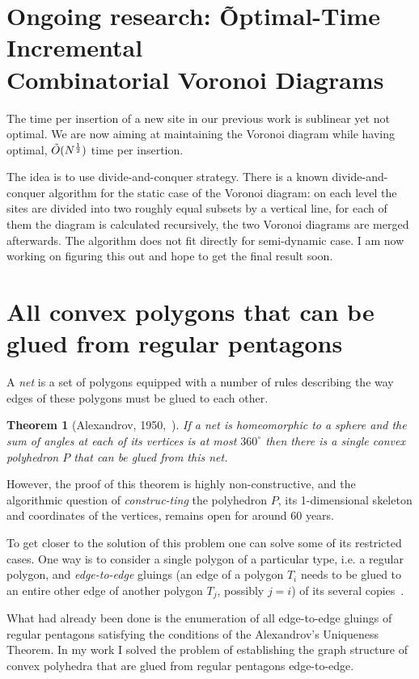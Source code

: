 \documentclass[a4paper,11pt]{article}
\def\vsection#1{\vspace{-4mm}\section{#1}\vspace{-3mm}}
\newtheorem{theorem}{Theorem}
\theoremstyle{definition}
\begin{document}
\vsection{Ongoing research: \~Optimal-Time Incremental \\
	Combinatorial Voronoi Diagrams}

The time per insertion of a new site in our previous work is sublinear yet not optimal. We are now aiming at maintaining the Voronoi diagram while having optimal, $\tilde O(N^{\frac12})$ time per insertion.

The idea is to use divide-and-conquer strategy. There is a known divide-and-conquer algorithm for the static case of the Voronoi diagram: on each level the sites are divided into two roughly equal subsets by a vertical line, for each of them the diagram is calculated recursively, the two Voronoi diagrams are merged afterwards. The algorithm does not fit directly for semi-dynamic case. I am now working on figuring this out and hope to get the final result soon.

\vsection{All convex polygons that can be glued from regular pentagons}

	A \emph{net} is a set of polygons equipped with a number of rules describing the way edges of these polygons must be glued to each other.

\vspace{-2mm} \begin{theorem}[Alexandrov, 1950,~\cite{alex}]
\label{thm:alexandrov}
	If a net is homeomorphic to a sphere and the sum of angles at each of its vertices is at most $360^\circ$ then there is a single convex polyhedron $P$ that can be glued from this net.
\end{theorem} \vspace{-3mm}

However, the proof of this theorem is highly non-constructive, and the algorithmic question of {\it construc-\linebreak ting} the polyhedron $P$, its 1-dimensional skeleton and coordinates of the vertices, remains open for around 60 years.

To get closer to the solution of this problem one can solve some of its restricted cases. One way is to consider a single polygon of a particular type, i.e. a regular polygon, and {\it edge-to-edge} gluings (an edge of a polygon $T_i$ needs to be glued to an entire other edge of another polygon $T_j$, possibly $j=i$) of its several copies~\cite{gfalop}.

What had already been done is the enumeration of all edge-to-edge gluings of regular pentagons satisfying the conditions of the Alexandrov's Uniqueness Theorem. In my work I solved the problem of establishing the graph structure of convex polyhedra that are glued from regular pentagons edge-to-edge.
\end{document}

